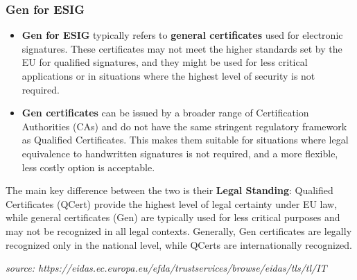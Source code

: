\documentclass{article}
\begin{document}
\subsubsection*{Gen for ESIG}
\begin{itemize}
    \item \textbf{Gen for ESIG} typically refers to \textbf{general certificates} used for electronic signatures. These certificates may not meet the higher standards set by the EU for qualified signatures, and they might be used for less critical applications or in situations where the highest level of security is not required.
    \item \textbf{Gen certificates} can be issued by a broader range of Certification Authorities (CAs) and do not have the same stringent regulatory framework as Qualified Certificates. This makes them suitable for situations where legal equivalence to handwritten signatures is not required, and a more flexible, less costly option is acceptable.
\end{itemize}
The main key difference between the two is their \textbf{Legal Standing}: Qualified Certificates (QCert) provide the highest level of legal certainty under EU law, while general certificates (Gen) are typically used for less critical purposes and may not be recognized in all legal contexts. Generally, Gen certificates are legally recognized only in the national level, while QCerts are internationally recognized. 

\textit{source: https://eidas.ec.europa.eu/efda/trust\-services/browse/eidas/tls/tl/IT}
\end{document}
